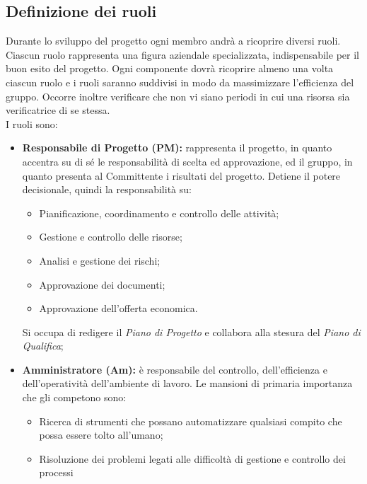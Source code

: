 	\subsection{Definizione dei ruoli}
		Durante lo sviluppo del progetto ogni membro andrà a ricoprire diversi ruoli. Ciascun ruolo rappresenta una figura aziendale specializzata, indispensabile per il buon esito del progetto. Ogni componente dovrà ricoprire almeno una volta ciascun ruolo e i ruoli saranno suddivisi in modo da massimizzare l'efficienza del gruppo. Occorre inoltre verificare che non vi siano periodi in cui una risorsa sia verificatrice di se stessa. \\
		I ruoli sono:
		\begin{itemize}
			\item \textbf{Responsabile di Progetto (PM):} rappresenta il progetto, in quanto accentra su di sé le responsabilità di scelta ed approvazione, ed il gruppo, in quanto presenta al Committente i risultati del progetto. Detiene il potere decisionale, quindi la responsabilità su: \\
			\begin{itemize}
				\item Pianificazione, coordinamento e controllo delle attività; \\
				\item Gestione e controllo delle risorse; \\
				\item Analisi e gestione dei rischi; \\
				\item Approvazione dei documenti; \\
				\item Approvazione dell’offerta economica. \\
			\end{itemize}
			Si occupa di redigere il \textit{Piano di Progetto} e collabora alla stesura del \textit{Piano di Qualifica};
			\item \textbf{Amministratore (Am):} è responsabile del controllo, dell'efficienza e dell'operatività dell'ambiente di lavoro. Le mansioni di primaria importanza che gli competono sono: \\
			\begin{itemize}
				\item Ricerca di strumenti che possano automatizzare qualsiasi compito che possa
essere tolto all'umano; \\
				\item Risoluzione dei problemi legati alle difficoltà di gestione e controllo dei processi

\end{itemize}
\end{itemize}
